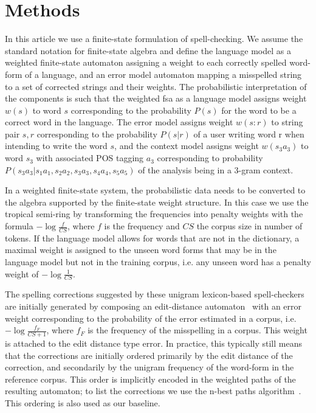 \documentclass{llncs}
\begin{document}
\section{Methods}
\label{sec:methods}

In this article we use a finite-state formulation of spell-checking. We
assume the standard notation for finite-state algebra and define the language
model as a weighted finite-state automaton assigning a weight to each correctly
spelled word-form of a language, and an error model automaton mapping a
misspelled string to a set of corrected strings and their weights. The
probabilistic interpretation of the components is such that the weighted fsa as
a language model assigns weight $w(s)$ to word $s$ corresponding to the probability
$P(s)$ for the word to be a correct word in the language. The error model assigns
weight $w(s:r)$ to string pair $s, r$ corresponding to the probability $P(s|r)$ of a
user writing word r when intending to write the word $s$, and the context model
assigns weight $w(s_3 a_3)$ to word $s_3$ with associated POS tagging $a_3$
corresponding to probability $P(s_3 a_3|s_1 a_1, s_2 a_2, s_3 a_3, s_4 a_4, s_5
a_5)$ of the analysis being in a 3-gram context.

In a weighted finite-state system, the probabilistic data needs to be converted
to the algebra supported by the finite-state weight structure.
In this case we use the tropical semi-ring by transforming the
frequencies into penalty weights with the formula $-\log\frac{f}{CS}$, where $f$ is
the frequency and $CS$ the corpus size in number of tokens. If the language
model allows for words that are not in the dictionary, a maximal weight is assigned
to the unseen word forms that may be in the language model but not in the training
corpus, i.e.  any unseen word has a penalty weight of $-\log\frac{1}{CS}$.

The spelling corrections suggested by these unigram lexicon-based spell-checkers
are initially generated by composing an edit-distance automaton~\cite{agata/2002} 
with an  error weight corresponding to the probability of the error
estimated in a corpus, i.e. $-\log\frac{f_{F}}{CS+1}$, where $f_F$ is the frequency
of the misspelling in a corpus. This weight is attached to the edit distance type
error. In practice, this typically still means that the corrections are
initially ordered primarily by the edit distance of the correction, and
secondarily by the unigram frequency of the word-form in the reference corpus.
This order is implicitly encoded in the weighted paths of the resulting
automaton; to list the corrections we use the n-best paths
algorithm~\cite{mohri/2002}. This ordering is also used as our baseline.
\end{document}
